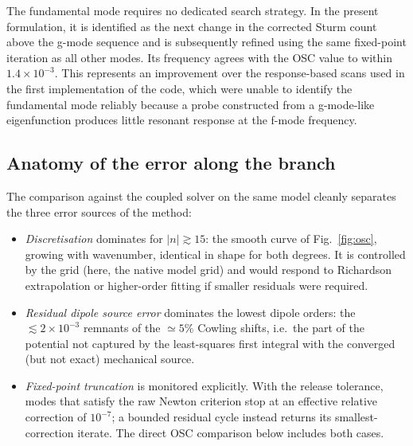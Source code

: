 \documentclass[]{aa}
\begin{document}
The fundamental mode requires no dedicated search strategy. In the present
formulation, it is identified as the next change in the corrected Sturm count
above the g-mode sequence and is subsequently refined using the same
fixed-point iteration as all other modes. Its frequency agrees with the OSC
value to within $1.4\times10^{-3}$. This represents an improvement over the response-based scans used in the
first implementation of the code, which were unable to identify the
fundamental mode reliably because a probe constructed from a g-mode-like
eigenfunction produces little resonant response at the f-mode frequency.



\subsection{Anatomy of the error along the branch}

The comparison against the coupled solver on the same model cleanly separates
the three error sources of the method:
\begin{itemize}
\item \emph{Discretisation} dominates for $|n|\gtrsim15$: the smooth curve of
  Fig.~\ref{fig:osc}, growing with wavenumber, identical in shape for both
  degrees.  It is controlled by the grid (here, the native model grid) and
  would respond to Richardson extrapolation or higher-order fitting if
  smaller residuals were required.
\item \emph{Residual dipole source error} dominates the lowest dipole orders:
  the $\lesssim2\times10^{-3}$ remnants of the $\simeq5\%$ Cowling shifts,
  i.e.\ the part of the potential not captured by the least-squares first
  integral with the converged (but not exact) mechanical source.
\item \emph{Fixed-point truncation} is monitored explicitly. With the release
  tolerance, modes that satisfy the raw Newton criterion stop at an effective
  relative correction of $10^{-7}$; a
  bounded residual cycle instead returns its smallest-correction iterate.
  The direct OSC comparison below includes both cases.
\end{itemize}

\end{document}

